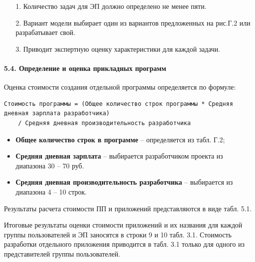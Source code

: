 \documentclass[12pt, a4paper, simple]{eskdtext}
\begin{document}
    \begin{enumerate}
        \item[1.] Количество задач для ЭП должно определено не менее пяти.
        \item[2.] Вариант модели выбирает один из вариантов предложенных на рис.Г.2 или разрабатывает свой.
        \item[3.] Приводит экспертную оценку характеристики для каждой задачи. 
    \end{enumerate}

    \paragraph{5.4. Определение и оценка прикладных программ} \hspace{0pt}

    Оценка стоимости создания отдельной программы определяется по формуле:

    \begin{lstlisting}[language=Formula]
Стоимость программы = (Общее количество строк программы * Средняя дневная зарплата разработчика)
    / Средняя дневная производительность разработчика
\end{lstlisting}

\begin{itemize}
    \item \textbf{Общее количество строк в программе} – определяется из табл. Г.2;
    \item \textbf{Средняя дневная зарплата} – выбирается разработчиком проекта из диапазона  30 – 70 руб.
    \item \textbf{Средняя дневная производительность разработчика} – выбирается  из диапазона  4 – 10 строк.
\end{itemize} 

    Результаты расчета стоимости ПП и приложений представляются в виде табл. 5.1.

    Итоговые результаты оценки стоимости приложений и их названия для каждой группы пользователей и ЭП зано­сятся
    в строки 9 и 10 табл. 3.1.
    Стоимость разработки отдельного приложения приводится в табл. 3.1 только для одного из представителей группы пользователей.
\end{document}
